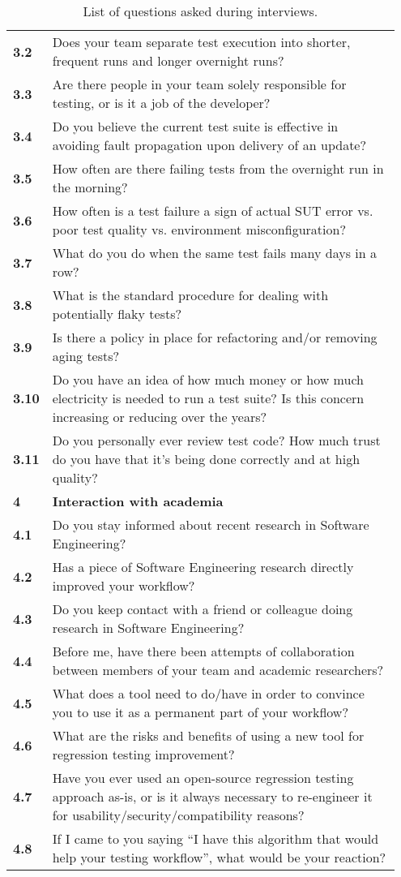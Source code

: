\begin{table}[]
\begin{tabular}{p{0.05\linewidth}p{0.9\linewidth}}
\textbf{3.2} & Does your team separate test execution into shorter, frequent runs and longer overnight runs? \\
\textbf{3.3} & Are there people in your team solely responsible for testing, or is it a job of the developer? \\
\textbf{3.4} & Do you believe the current test suite is effective in avoiding fault propagation upon delivery of an update? \\
\textbf{3.5} & How often are there failing tests from the overnight run in the morning? \\
\textbf{3.6} & How often is a test failure a sign of actual SUT error vs. poor test quality vs. environment misconfiguration? \\
\textbf{3.7} & What do you do when the same test fails many days in a row? \\
\textbf{3.8} & What is the standard procedure for dealing with potentially flaky tests? \\
\textbf{3.9} & Is there a policy in place for refactoring and/or removing aging tests? \\
\textbf{3.10} & Do you have an idea of how much money or how much electricity is needed to run a test suite? Is this concern increasing or reducing over the years? \\
\textbf{3.11} & Do you personally ever review test code? How much trust do you have that it's being done correctly and at high quality? \\
\midrule
\textbf{4} & \textbf{Interaction with academia} \\
\textbf{4.1} & Do you stay informed about recent research in Software Engineering? \\
\textbf{4.2} & Has a piece of Software Engineering research directly improved your workflow? \\
\textbf{4.3} & Do you keep contact with a friend or colleague doing research in Software Engineering? \\
\textbf{4.4} & Before me, have there been attempts of collaboration between members of your team and academic researchers? \\
\textbf{4.5} & What does a tool need to do/have in order to convince you to use it as a permanent part of your workflow? \\
\textbf{4.6} & What are the risks and benefits of using a new tool for regression testing improvement? \\
\textbf{4.7} & Have you ever used an open-source regression testing approach as-is, or is it always necessary to re-engineer it for usability/security/compatibility reasons? \\
\textbf{4.8} & If I came to you saying ``I have this algorithm that would help your testing workflow'', what would be your reaction? \\
\bottomrule
\end{tabular}\\
\caption{List of questions asked during interviews.}
\label{table:interview_questions}
\end{table}
